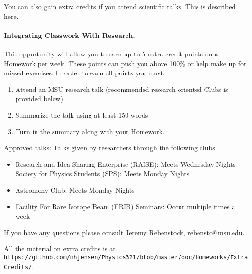 \documentclass[%
oneside,                 %
final,                   %
10pt]{article}
\begin{document}
\noindent

You can also gain extra credits if you attend scientific talks.
This is described here.


\paragraph{Integrating Classwork With Research.}
This opportunity will allow you to earn up to 5 extra credit points on a Homework per week. These points can push you above 100\% or help make up for missed exercises.
In order to earn all points you must:

\begin{enumerate}
\item Attend an MSU research talk (recommended research oriented Clubs is  provided below)

\item Summarize the talk using at least 150 words

\item Turn in the summary along with your Homework.
\end{enumerate}

\noindent
Approved talks:
Talks given by researchers through the following clubs:
\begin{itemize}
\item Research and Idea Sharing Enterprise (RAISE)​: Meets Wednesday Nights Society for Physics Students (SPS)​: Meets Monday Nights

\item Astronomy Club​: Meets Monday Nights

\item Facility For Rare Isotope Beam (FRIB) Seminars: ​Occur multiple times a week
\end{itemize}

\noindent
If you have any questions please consult Jeremy Rebenstock, rebensto@msu.edu.

All the material on extra credits is at \href{{https://github.com/mhjensen/Physics321/blob/master/doc/Homeworks/ExtraCredits/}}{\nolinkurl{https://github.com/mhjensen/Physics321/blob/master/doc/Homeworks/ExtraCredits/}}. 







\end{document}
